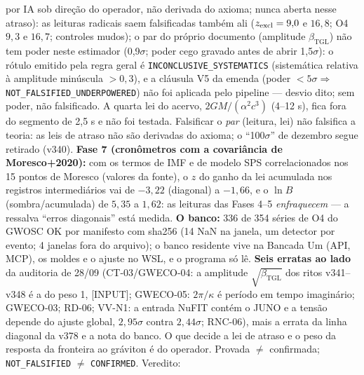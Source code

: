 \documentclass[11pt]{article}
\newcommand{\bTGL}{\beta_{\mathrm{TGL}}}\newcommand{\Msun}{M_{\odot}}\newcommand{\TGL}{\mathrm{TGL}}
\theoremstyle{definition}\newtheorem{deriv}{Derivação}
\begin{document}
por IA sob direção do operador, não derivada do axioma; nunca aberta nesse atraso): as leituras radicais saem falsificadas também ali ($z_{\rm excl}=9{,}0$ e $16{,}8$; O4 $9{,}3$ e $16{,}7$; controles mudos); o par do próprio documento (amplitude $\bTGL$) não tem poder neste estimador (0{,}9$\sigma$; poder cego gravado antes de abrir 1{,}5$\sigma$): o rótulo emitido pela regra geral é \texttt{INCONCLUSIVE\_SYSTEMATICS} (sistemática relativa à amplitude minúscula $>0{,}3$), e a cláusula V5 da emenda (poder $<5\sigma\Rightarrow$ \texttt{NOT\_FALSIFIED\_UNDERPOWERED}) não foi aplicada pelo pipeline --- desvio dito; sem poder, não falsificado. A quarta lei do acervo, $2GM/(\alpha^2c^3)$ (4--12 s), fica fora do segmento de 2{,}5 s e não foi testada. Falsificar o \emph{par} (leitura, lei) não falsifica a teoria: as leis de atraso não são derivadas do axioma; o ``100$\sigma$'' de dezembro segue retirado (v340). \textbf{Fase 7 (cronômetros com a covariância de Moresco+2020):} com os termos de IMF e de modelo SPS correlacionados nos 15 pontos de Moresco (valores da fonte), o $z$ do ganho da lei acumulada nos registros intermediários vai de $-3{,}22$ (diagonal) a $-1{,}66$, e o $\ln B$(sombra/acumulada) de $5{,}35$ a $1{,}62$: as leituras das Fases 4--5 \emph{enfraquecem} --- a ressalva ``erros diagonais'' está medida. \textbf{O banco:} 336 de 354 séries de O4 do GWOSC OK por manifesto com sha256 (14 NaN na janela, um detector por evento; 4 janelas fora do arquivo); o banco residente vive na Bancada Um (API, MCP), os moldes e o ajuste no WSL, e o programa só lê. \textbf{Seis erratas ao lado} da auditoria de 28/09 (CT-03/GWECO-04: a amplitude $\sqrt{\bTGL}$ dos ritos v341--v348 é a do peso 1, \textsf{[INPUT]}; GWECO-05: $2\pi/\kappa$ é período em tempo imaginário; GWECO-03; RD-06; VV-N1: a entrada NuFIT contém o JUNO e a tensão depende do ajuste global, $2{,}95\sigma$ contra $2{,}44\sigma$; RNC-06), mais a errata da linha diagonal da v378 e a nota do banco. O que decide a lei de atraso e o peso da resposta da fronteira ao gráviton é do operador. Provada $\neq$ confirmada; \texttt{NOT\_FALSIFIED} $\neq$ \texttt{CONFIRMED}. Veredito: 
\end{document}

